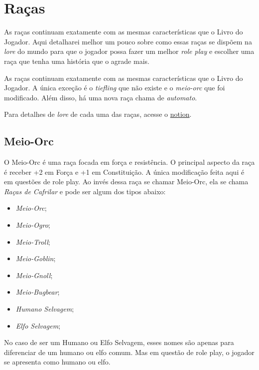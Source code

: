 \chapter{Raças}%
\label{cha:racas}
\begin{multicols}{2}

As raças continuam exatamente com as mesmas características que o Livro do
Jogador. Aqui detalharei melhor um pouco sobre como essas raças se dispõem na
\textit{lore} do mundo para que o jogador possa fazer um melhor \textit{role
play} e escolher uma raça que tenha uma história que o agrade mais.

As raças continuam exatamente com as mesmas características que o Livro do
Jogador. A única exceção é o \textit{tiefling} que não existe e o
\textit{meio-orc} que foi modificado. Além disso, há uma nova raça chama de
\textit{automato}.

Para detalhes de \textit{lore} de cada uma das raças, acesse o
\href{https://www.notion.so/giatro/Ra-as-bbe65832d376458898bacc23741f00d3?pvs=4}
{notion}.

\section{Meio-Orc}%

O Meio-Orc é uma raça focada em força e resistência. O principal aspecto da raça
é receber +2 em Força e +1 em Constituição. A única modificação feita aqui é em
questões de role play. Ao invés dessa raça se chamar Meio-Orc, ela se chama
\textit{Raças de Cafrilar} e pode ser algum dos tipos abaixo:

\begin{itemize}
    \item \textit{Meio-Orc};
    \item \textit{Meio-Ogro};
    \item \textit{Meio-Troll};
    \item \textit{Meio-Goblin};
    \item \textit{Meio-Gnoll};
    \item \textit{Meio-Bugbear};
    \item \textit{Humano Selvagem};
    \item \textit{Elfo Selvagem};
\end{itemize}

No caso de ser um Humano ou Elfo Selvagem, esses nomes são apenas para
diferenciar de um humano ou elfo comum. Mas em questão de role play, o jogador
se apresenta como humano ou elfo.


\end{multicols}
